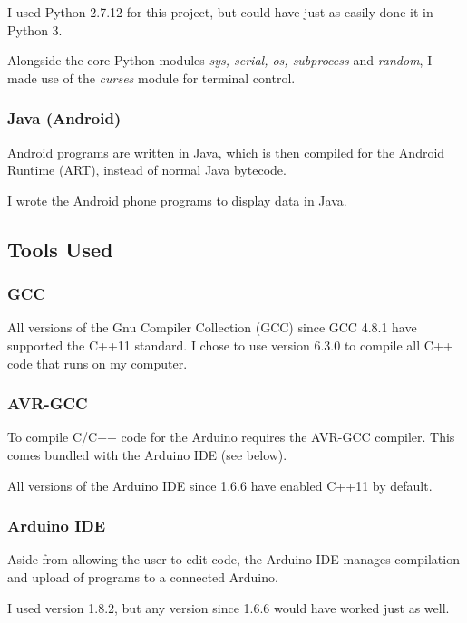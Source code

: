 \documentclass[a4paper]{article}
\begin{document}
I used Python 2.7.12 for this project, but could have just as easily done it in Python 3.

Alongside the core Python modules \textit{sys, serial, os, subprocess} and \textit{random}, I made use of the \textit{curses}\cite{ppref13} module for terminal control.

\subsubsection{Java (Android)}

Android\cite{ppref14} programs are written in Java, which is then compiled for the Android Runtime (ART)\cite{ppref15}, instead of normal Java bytecode.

I wrote the Android phone programs to display data in Java.

\subsection{Tools Used}%

\subsubsection{GCC}

All versions of the Gnu Compiler Collection (GCC) since GCC 4.8.1 have supported the C++11 standard\cite{ppref16}. I chose to use version 6.3.0\cite{ppref17} to compile all C++ code that runs on my computer.

\subsubsection{AVR-GCC}

To compile C/C++ code for the Arduino requires the AVR-GCC compiler. This comes bundled with the Arduino IDE\cite{ppref18} (see below).

All versions of the Arduino IDE since 1.6.6 have enabled C++11 by default.

\subsubsection{Arduino IDE}

Aside from allowing the user to edit code, the Arduino IDE\cite{ppref18} manages compilation and upload of programs to a connected Arduino.

I used version 1.8.2, but any version since 1.6.6 would have worked just as well.
\end{document}

